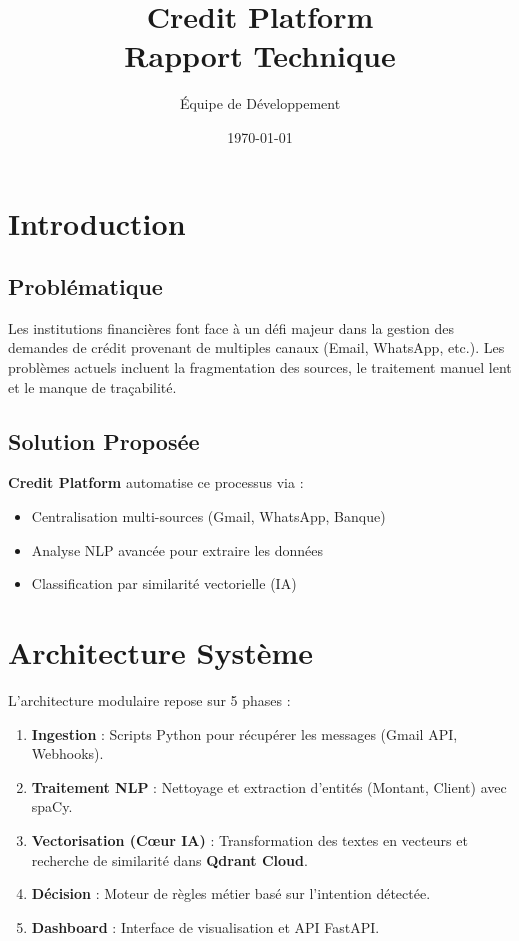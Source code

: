 \documentclass[11pt,a4paper]{article}
\title{\textbf{Credit Platform}\\Rapport Technique}
\author{Équipe de Développement}
\date{\today}
\begin{document}
\maketitle
\tableofcontents
\newpage

\section{Introduction}

\subsection{Problématique}
Les institutions financières font face à un défi majeur dans la gestion des demandes de crédit provenant de multiples canaux (Email, WhatsApp, etc.). Les problèmes actuels incluent la fragmentation des sources, le traitement manuel lent et le manque de traçabilité.

\subsection{Solution Proposée}
\textbf{Credit Platform} automatise ce processus via :
\begin{itemize}
    \item Centralisation multi-sources (Gmail, WhatsApp, Banque)
    \item Analyse NLP avancée pour extraire les données
    \item Classification par similarité vectorielle (IA)
\end{itemize}

\section{Architecture Système}

L'architecture modulaire repose sur 5 phases :

\begin{enumerate}
    \item \textbf{Ingestion} : Scripts Python pour récupérer les messages (Gmail API, Webhooks).
    \item \textbf{Traitement NLP} : Nettoyage et extraction d'entités (Montant, Client) avec spaCy.
    \item \textbf{Vectorisation (Cœur IA)} : Transformation des textes en vecteurs et recherche de similarité dans \textbf{Qdrant Cloud}.
    \item \textbf{Décision} : Moteur de règles métier basé sur l'intention détectée.
    \item \textbf{Dashboard} : Interface de visualisation et API FastAPI.
\end{enumerate}
\end{document}

